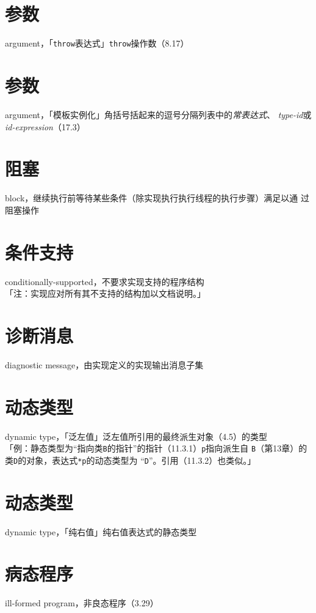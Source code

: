 \section{参数}
\noindent argument，「\texttt{throw}表达式」\texttt{throw}操作数（8.17）

\section{参数}
\noindent argument，「模板实例化」角括号括起来的逗号分隔列表中的\textit{常表达式}、
\textit{type-id}或\textit{id-expression}（17.3）

\section{阻塞}
\noindent block，继续执行前等待某些条件（除实现执行执行线程的执行步骤）满足以通
过阻塞操作

\section{条件支持}
\noindent conditionally-supported，不要求实现支持的程序结构 \\
「注：实现应对所有其不支持的结构加以文档说明。」

\section{诊断消息}
\noindent diagnostic message，由实现定义的实现输出消息子集

\section{动态类型}
\noindent dynamic type，「泛左值」泛左值所引用的最终派生对象（4.5）的类型 \\
「例：静态类型为``指向类\texttt{B}的指针''的指针（11.3.1）\texttt{p}指向派生自
\texttt{B}（第13章）的类\texttt{D}的对象，表达式\texttt{*p}的动态类型为
``\texttt{D}''。引用（11.3.2）也类似。」

\section{动态类型}
\noindent dynamic type，「纯右值」纯右值表达式的静态类型

\section{病态程序}
\noindent ill-formed program，非良态程序（3.29）

